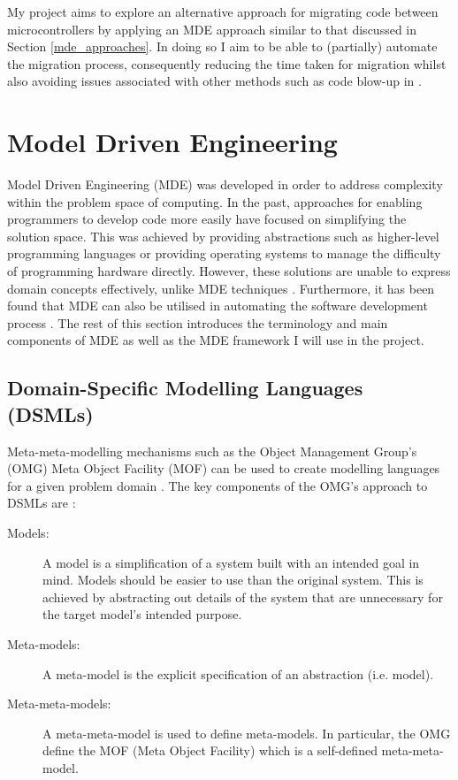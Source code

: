 \documentclass{UoYCSproject}
\begin{document}
My project aims to explore an alternative approach for migrating code between microcontrollers by applying an MDE approach similar to that discussed in Section \ref{mde_approaches}. In doing so I aim to be able to (partially) automate the migration process, consequently reducing the time taken for migration whilst also avoiding issues associated with other methods such as code blow-up in \parencite{gerasimou2017technical}.

\section{Model Driven Engineering} \label{mde_bg}
Model Driven Engineering (MDE) was developed in order to address complexity within the problem space of computing. In the past, approaches for enabling programmers to develop code more easily have focused on simplifying the solution space. This was achieved by providing abstractions such as higher-level programming languages or providing operating systems to manage the difficulty of programming hardware directly. However, these solutions are unable to express domain concepts effectively, unlike MDE techniques \parencite{schmidt2006model}. Furthermore, it has been found that MDE can also be utilised in automating the software development process \parencite{bezivin2004search}.
\newline
The rest of this section introduces the terminology and main components of MDE as well as the MDE framework I will use in the project.

\subsection{Domain-Specific Modelling Languages (DSMLs)}
Meta-meta-modelling mechanisms such as the Object Management Group's (OMG) Meta Object Facility (MOF) can be used to create modelling languages for a given problem domain \parencite{mussbacher2014relevance}. The key components of the OMG's approach to DSMLs are \parencite{bezivin2001towards}:
\begin{description}
\item[Models:] A model is a simplification of a system built with an intended goal in mind. Models should be easier to use than the original system. This is achieved by abstracting out details of the system that are unnecessary for the target model's intended purpose.
\item[Meta-models:] A meta-model is the explicit specification of an abstraction (i.e. model). 
\item[Meta-meta-models:]  A meta-meta-model is used to define meta-models. In particular, the OMG define the MOF (Meta Object Facility) which is a self-defined meta-meta-model.
\end{description}
\end{document}
